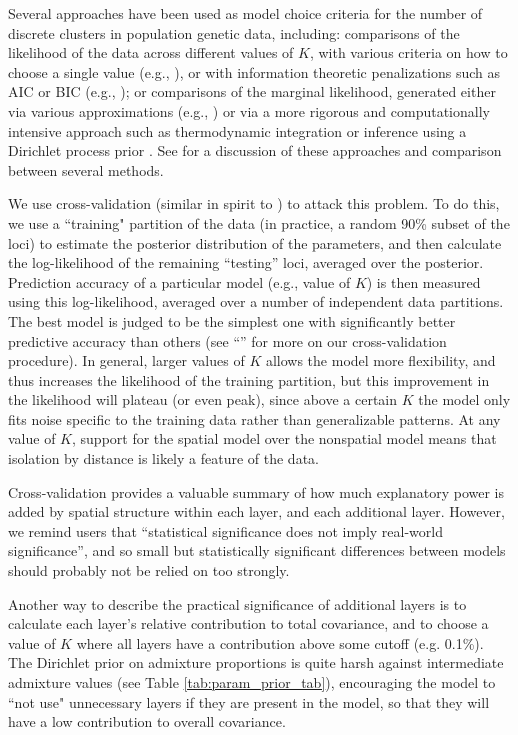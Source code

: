 \documentclass[10pt,letterpaper]{article}
\newcommand{\secref}[1]{``\nameref{#1}''}
\begin{document}
Several approaches have been used as model choice criteria 
for the number of discrete clusters in population genetic data, including: 
comparisons of the likelihood of the data across different values of $K$,
with various criteria on how to choose a single value (e.g., \cite{Evanno2005}),
or with information theoretic penalizations such as AIC or BIC (e.g., \cite{ADMIXTURE});
or comparisons of the marginal likelihood, 
generated either via various approximations (e.g., \cite{STRUCTURE})
or via a more rigorous and computationally intensive approach such as thermodynamic integration \cite{verity_nichols2016}
or inference using a Dirichlet process prior \cite{huelsenbeck2007inference}.
See \cite{verity_nichols2016} for a discussion of these approaches and comparison
between several methods.

We use cross-validation (similar in spirit to \cite{ADMIXTURE_xval}) to attack this problem.
To do this,
we use a ``training" partition of the data (in practice, a random 90\% subset of the loci)
to estimate the posterior distribution of the parameters,
and then calculate the log-likelihood of the remaining ``testing'' loci,
averaged over the posterior.
Prediction accuracy of a particular model (e.g., value of $K$)
is then measured using this log-likelihood,
averaged over a number of independent data partitions.
The best model is judged to be the simplest one with significantly better predictive accuracy
than others (see \secref{Xvalidation} for more on our cross-validation procedure).
In general, larger values of $K$ allows the model more flexibility,
and thus increases the likelihood of the training partition, 
but this improvement in the likelihood will plateau (or even peak), 
since above a certain $K$ the model only fits noise specific to the training data 
rather than generalizable patterns.
At any value of $K$, support for the spatial model over the nonspatial model 
means that isolation by distance is likely a feature of the data.

Cross-validation provides a valuable summary of how much explanatory power
is added by spatial structure within each layer, and each additional layer.
However, we remind users that ``statistical significance does not imply real-world significance'',
and so small but statistically significant differences between models
should probably not be relied on too strongly.

Another way to describe the practical significance of additional layers
is to calculate each layer's relative contribution to total covariance, 
and to choose a value of $K$ where all layers have a contribution above some cutoff (e.g. 0.1\%).
The Dirichlet prior on admixture proportions
is quite harsh against intermediate admixture values (see Table \ref{tab:param_prior_tab}),  
encouraging the model to ``not use" unnecessary layers if they are
present in the model, 
so that they will have a low contribution to overall covariance.
\end{document}
